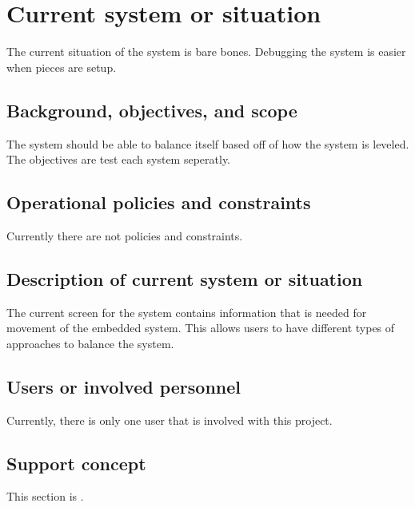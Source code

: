 
\chapter{Current system or situation}
\label{loc:Current System or Situation}


The current situation of the system is bare bones. Debugging the system is easier when pieces are setup.


\section{Background, objectives, and scope}
\label{loc:Background, Objectives, and Scope}


The system should be able to balance itself based off of how the system is leveled. The objectives are test each system seperatly.


\section{Operational policies and constraints}
\label{loc:Operational Policies and Constraints}


Currently there are not policies and constraints.


\section{Description of current system or situation}
\label{loc:Description of current system or situation}


The current screen for the system contains information that is needed for movement of the embedded system.
This allows users to have different types of approaches to balance the system.


\section{Users or involved personnel}
\label{loc:Users or involved personnel}


Currently, there is only one user that is involved with this project.


\section{Support concept}
\label{loc:Support concept}


This section is \TBD.
